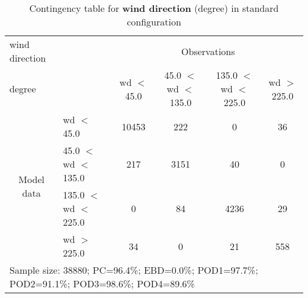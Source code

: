 \documentclass[11pt,english]{article}
\begin{document}
\begin{table}[]
\begin{center}
\begin{tabular}{llcccc}
\hline
{wind direction}                                       &                                                    & \multicolumn{4}{c}{Observations}                 \\
{degree}                                       &                             & wd $<$ 45.0   & 45.0 $<$ wd $<$ 135.0 & 135.0 $<$ wd $<$ 225.0 & wd $>$ 225.0 \\
\hline
\multicolumn{1}{c}{\multirow{4}{*}{Model data}}  & wd $<$ 45.0              & 10453                & 222                       & 0              & 36\\
                                                 & 45.0  $<$ wd $<$ 135.0 & 217                & 3151                       & 40              & 0\\
                                                 & 135.0  $<$ wd $<$ 225.0 & 0                & 84                      & 4236             & 29\\
                                                 & wd $>$ 225.0               & 34               & 0                      & 21             & 558\\
\hline 
\multicolumn{6}{l}{Sample size: 38880; PC=96.4\%; EBD=0.0\%; POD1=97.7\%; POD2=91.1\%; POD3=98.6\%; POD4=89.6\%}                 \\
\end{tabular}
\end{center}
\caption{Contingency table for \textbf{wind direction} (degree) in standard configuration}
\label{tab:contingencywdAFT}
\end{table}

\newpage
\end{document}
